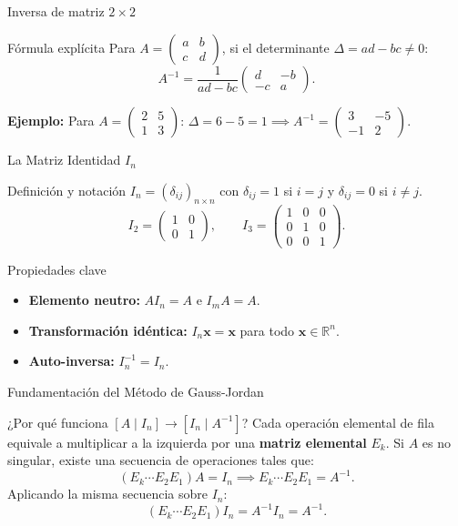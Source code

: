 \documentclass[11pt]{beamer}
\newcommand{\R}{\mathbb{R}}
\newcommand{\vv}[1]{\mathbf{#1}}
\begin{document}
\begin{frame}{Inversa de matriz $2\times 2$}
  \begin{block}{Fórmula explícita}
    Para $A = \begin{pmatrix} a & b \\ c & d \end{pmatrix}$, si el determinante $\Delta = ad - bc \neq 0$:
    \[
      A^{-1} = \frac{1}{ad - bc} \begin{pmatrix} d & -b \\ -c & a \end{pmatrix}.
    \]
  \end{block}
  \vfill
  \textbf{Ejemplo:} Para $A = \begin{pmatrix} 2 & 5 \\ 1 & 3 \end{pmatrix}$:
  $\Delta = 6 - 5 = 1 \implies A^{-1} = \begin{pmatrix} 3 & -5 \\ -1 & 2 \end{pmatrix}$.
\end{frame}

\begin{frame}{La Matriz Identidad $I_n$}
  \begin{block}{Definición y notación}
    $I_n = (\delta_{ij})_{n\times n}$ con $\delta_{ij}=1$ si $i=j$ y $\delta_{ij}=0$ si $i\neq j$.
    \[
      I_2 = \begin{pmatrix} 1&0\\0&1 \end{pmatrix}, \qquad I_3 = \begin{pmatrix} 1&0&0\\0&1&0\\0&0&1 \end{pmatrix}.
    \]
  \end{block}
  \vfill
  \begin{block}{Propiedades clave}
    \begin{itemize}
      \item \textbf{Elemento neutro:} $A I_n = A$ e $I_m A = A$.
      \item \textbf{Transformación idéntica:} $I_n \vv{x} = \vv{x}$ para todo $\vv{x}\in\R^n$.
      \item \textbf{Auto-inversa:} $I_n^{-1} = I_n$.
    \end{itemize}
  \end{block}
\end{frame}

\begin{frame}{Fundamentación del Método de Gauss-Jordan}
  \begin{block}{¿Por qué funciona $[A \mid I_n] \to [I_n \mid A^{-1}]$?}
    Cada operación elemental de fila equivale a multiplicar a la izquierda por una \textbf{matriz elemental} $E_k$.
    \vfill
    Si $A$ es no singular, existe una secuencia de operaciones tales que:
    \[
      (E_k \cdots E_2 E_1) A = I_n \implies E_k \cdots E_2 E_1 = A^{-1}.
    \]
    \vfill
    Aplicando la misma secuencia sobre $I_n$:
    \[
      (E_k \cdots E_2 E_1) I_n = A^{-1} I_n = A^{-1}.
    \]
  \end{block}
\end{frame}
\end{document}
